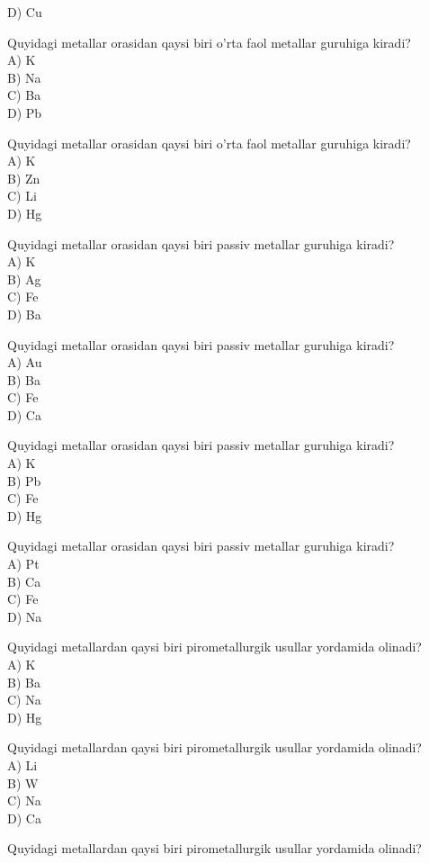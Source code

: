 D) Cu
  \item Quyidagi metallar orasidan qaysi biri o'rta faol metallar guruhiga kiradi?\\
A) K\\
B) Na\\
C) Ba\\
D) Pb
  \item Quyidagi metallar orasidan qaysi biri o'rta faol metallar guruhiga kiradi?\\
A) K\\
B) Zn\\
C) Li\\
D) Hg
  \item Quyidagi metallar orasidan qaysi biri passiv metallar guruhiga kiradi?\\
A) K\\
B) Ag\\
C) Fe\\
D) Ba
  \item Quyidagi metallar orasidan qaysi biri passiv metallar guruhiga kiradi?\\
A) Au\\
B) Ba\\
C) Fe\\
D) Ca
  \item Quyidagi metallar orasidan qaysi biri passiv metallar guruhiga kiradi?\\
A) K\\
B) Pb\\
C) Fe\\
D) Hg
  \item Quyidagi metallar orasidan qaysi biri passiv metallar guruhiga kiradi?\\
A) Pt\\
B) Ca\\
C) Fe\\
D) Na
  \item Quyidagi metallardan qaysi biri pirometallurgik usullar yordamida olinadi?\\
A) K\\
B) Ba\\
C) Na\\
D) Hg
  \item Quyidagi metallardan qaysi biri pirometallurgik usullar yordamida olinadi?\\
A) Li\\
B) W\\
C) Na\\
D) Ca
  \item Quyidagi metallardan qaysi biri pirometallurgik usullar yordamida olinadi?\\
